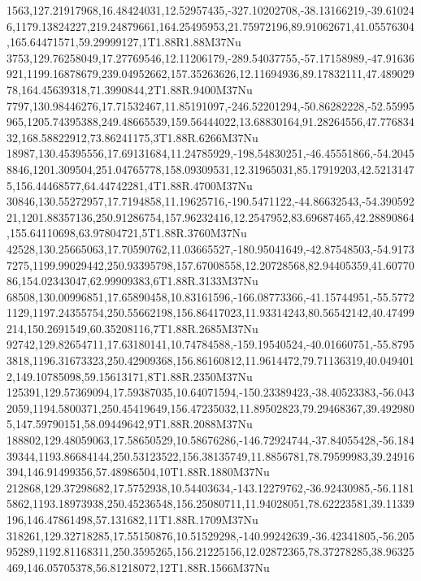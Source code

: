1563,127.21917968,16.48424031,12.52957435,-327.10202708,-38.13166219,-39.610246,1179.13824227,219.24879661,164.25495953,21.75972196,89.91062671,41.05576304,165.64471571,59.29999127,1T1.88R1.88M37Nu
3753,129.76258049,17.27769546,12.11206179,-289.54037755,-57.17158989,-47.91636921,1199.16878679,239.04952662,157.35263626,12.11694936,89.17832111,47.48902978,164.45639318,71.3990844,2T1.88R.9400M37Nu
7797,130.98446276,17.71532467,11.85191097,-246.52201294,-50.86282228,-52.55995965,1205.74395388,249.48665539,159.56444022,13.68830164,91.28264556,47.77683432,168.58822912,73.86241175,3T1.88R.6266M37Nu
18987,130.45395556,17.69131684,11.24785929,-198.54830251,-46.45551866,-54.20458846,1201.309504,251.04765778,158.09309531,12.31965031,85.17919203,42.52131475,156.44468577,64.44742281,4T1.88R.4700M37Nu
30846,130.55272957,17.7194858,11.19625716,-190.5471122,-44.86632543,-54.39059221,1201.88357136,250.91286754,157.96232416,12.2547952,83.69687465,42.28890864,155.64110698,63.97804721,5T1.88R.3760M37Nu
42528,130.25665063,17.70590762,11.03665527,-180.95041649,-42.87548503,-54.91737275,1199.99029442,250.93395798,157.67008558,12.20728568,82.94405359,41.6077086,154.02343047,62.99909383,6T1.88R.3133M37Nu
68508,130.00996851,17.65890458,10.83161596,-166.08773366,-41.15744951,-55.57721129,1197.24355754,250.55662198,156.86417023,11.93314243,80.56542142,40.47499214,150.2691549,60.35208116,7T1.88R.2685M37Nu
92742,129.82654711,17.63180141,10.74784588,-159.19540524,-40.01660751,-55.87953818,1196.31673323,250.42909368,156.86160812,11.9614472,79.71136319,40.0494012,149.10785098,59.15613171,8T1.88R.2350M37Nu
125391,129.57369094,17.59387035,10.64071594,-150.23389423,-38.40523383,-56.0432059,1194.5800371,250.45419649,156.47235032,11.89502823,79.29468367,39.4929805,147.59790151,58.09449642,9T1.88R.2088M37Nu
188802,129.48059063,17.58650529,10.58676286,-146.72924744,-37.84055428,-56.18439344,1193.86684144,250.53123522,156.38135749,11.8856781,78.79599983,39.24916394,146.91499356,57.48986504,10T1.88R.1880M37Nu
212868,129.37298682,17.5752938,10.54403634,-143.12279762,-36.92430985,-56.11815862,1193.18973938,250.45236548,156.25080711,11.94028051,78.62223581,39.11339196,146.47861498,57.131682,11T1.88R.1709M37Nu
318261,129.32718285,17.55150876,10.51529298,-140.99242639,-36.42341805,-56.20595289,1192.81168311,250.3595265,156.21225156,12.02872365,78.37278285,38.96325469,146.05705378,56.81218072,12T1.88R.1566M37Nu
